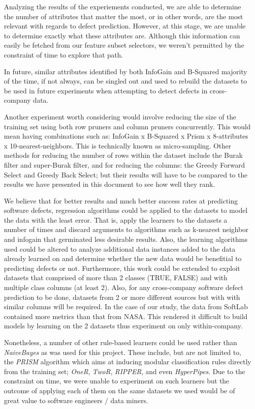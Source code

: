 \documentclass{sig-alternate}
\begin{document}
Analyzing the results of the experiements conducted, we are able to determine the number of attributes that matter the most, or in other words, are the most relevant with regards to defect prediction. However, at this stage, we are unable to determine exactly what these attributes are. Although this information can easily be fetched from our feature subset selectors, we weren't permitted by the constraint of time to explore that path.

In future, similar attributes identified by both InfoGain and B-Squared majority of the time, if not always, can be singled out and used to rebuild the datasets to be used in future experiments when attempting to detect defects in cross-company data.

Another experiment worth considering would involve reducing the size of the training set using both row pruners and column pruners concurrently. This would mean having combinations such as: InfoGain x B-Squared x Prism x 8-attributes x 10-nearest-neighbors. This is technically known as micro-sampling. Other methods for reducing the number of rows within the dataset include the Burak filter and super-Burak filter, and for reducing the columns: the Greedy Forward Select and Greedy Back Select; but their results will have to be compared to the results we have presented in this document to see how well they rank.

We believe that for better results and much better success rates at predicting software defects, regression algorithms could be applied to the datasets to model the data with the least error. That is, apply the learners to the datasets a number of times and discard arguments to algorithms such as k-nearest neighbor and infogain that germinated less desirable results. Also, the learning algorithms used could be altered to analyze additional data instances added to the data already learned on and determine whether the new data would be benefitial to predicting defects or not. Furthermore, this work could be extended to exploit datasets that comprised of more than 2 classes (TRUE, FALSE) and with multiple class columns (at least 2). Also, for any cross-company software defect prediction to be done, datasets from 2 or more different sources but with with similar columns will be required. In the case of our study, the data from SoftLab contained more metrics than that from NASA. This rendered it difficult to build models by learning on the 2 datasets thus experiment on only within-company.

Nonetheless, a number of other rule-based learners could be used rather than {\em NaiveBayes} as was used for this project. These include, but are not limited to, the {\em PRISM} algorithm which aims at inducing modular classification rules directly from the training set; {\em OneR}, {\em TwoR}, {\em RIPPER}, and even {\em HyperPipes}. Due to the constraint on time, we were unable to experiment on such learners but the outcome of applying each of them on the same datasets we used would be of great value to software engineers / data miners. 
\end{document}
